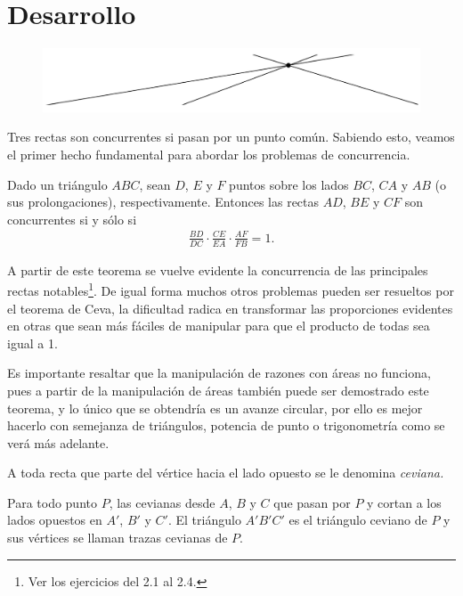 \section{Desarrollo}

\begin{figure}[htb]
    \centering
    \includegraphics[width=14cm]{images/concurrence-1}
\end{figure}

Tres rectas son concurrentes si pasan por un punto común.
Sabiendo esto, veamos el primer hecho fundamental para abordar los problemas de concurrencia.

\begin{section-theorem.tcb}
    Dado un triángulo $ABC$, sean $D$, $E$ y $F$ puntos sobre los lados $BC$, $CA$ y $AB$ (o sus prolongaciones), respectivamente.
    Entonces las rectas $AD$, $BE$ y $CF$ son concurrentes si y sólo si
    \begin{gather*}
        \frac{BD}{DC} \cdot \frac{CE}{EA} \cdot \frac{AF}{FB} = 1.
    \end{gather*}
\end{section-theorem.tcb}

A partir de este teorema se vuelve evidente la concurrencia de las principales rectas notables\footnote{Ver los ejercicios del 2.1 al 2.4.}.
De igual forma muchos otros problemas pueden ser resueltos por el teorema de Ceva, la dificultad radica en transformar las proporciones evidentes en otras que sean más fáciles de manipular para que el producto de todas sea igual a 1.

Es importante resaltar que la manipulación de razones con áreas no funciona, pues a partir de la manipulación de áreas también puede ser demostrado este teorema, y lo único que se obtendría es un avanze circular, por ello es mejor hacerlo con semejanza de triángulos, potencia de punto o trigonometría como se verá más adelante.

\begin{section-definition}
    A toda recta que parte del vértice hacia el lado opuesto se le denomina \textit{ceviana.}
\end{section-definition}

\begin{section-definition}
    Para todo punto $P$, las cevianas desde $A$, $B$ y $C$ que pasan por $P$ y cortan a los lados opuestos en $A'$, $B'$ y $C'$.
    El triángulo $A'B'C'$ es el triángulo ceviano de $P$ y sus vértices se llaman trazas cevianas de $P$.
\end{section-definition}

